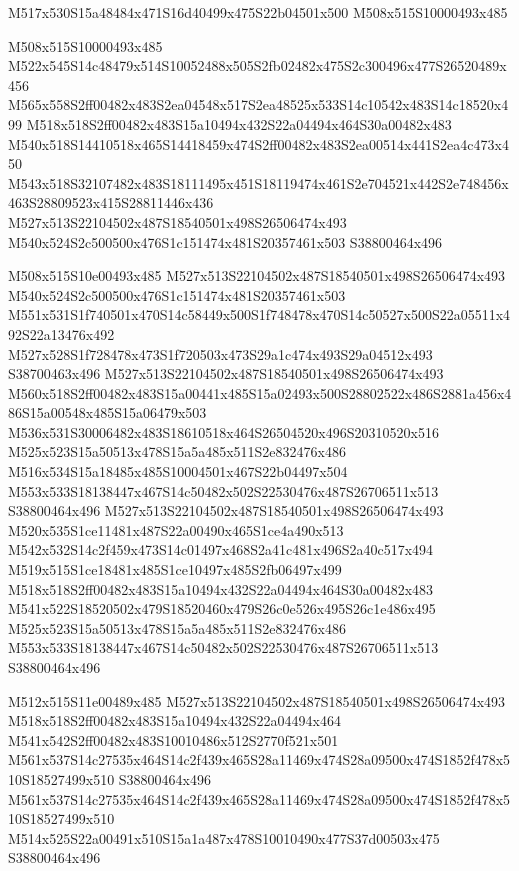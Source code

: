 \documentclass{article}
\begin{document}
\begin{multicols}{2}


\begin{center}
M517x530S15a48484x471S16d40499x475S22b04501x500 M508x515S10000493x485 
\end{center}


M508x515S10000493x485 M522x545S14c48479x514S10052488x505S2fb02482x475S2c300496x477S26520489x456 M565x558S2ff00482x483S2ea04548x517S2ea48525x533S14c10542x483S14c18520x499 M518x518S2ff00482x483S15a10494x432S22a04494x464S30a00482x483 M540x518S14410518x465S14418459x474S2ff00482x483S2ea00514x441S2ea4c473x450 M543x518S32107482x483S18111495x451S18119474x461S2e704521x442S2e748456x463S28809523x415S28811446x436 M527x513S22104502x487S18540501x498S26506474x493 M540x524S2c500500x476S1c151474x481S20357461x503 S38800464x496

M508x515S10e00493x485 M527x513S22104502x487S18540501x498S26506474x493 M540x524S2c500500x476S1c151474x481S20357461x503 M551x531S1f740501x470S14c58449x500S1f748478x470S14c50527x500S22a05511x492S22a13476x492 M527x528S1f728478x473S1f720503x473S29a1c474x493S29a04512x493 S38700463x496 M527x513S22104502x487S18540501x498S26506474x493 M560x518S2ff00482x483S15a00441x485S15a02493x500S28802522x486S2881a456x486S15a00548x485S15a06479x503 M536x531S30006482x483S18610518x464S26504520x496S20310520x516 M525x523S15a50513x478S15a5a485x511S2e832476x486 M516x534S15a18485x485S10004501x467S22b04497x504 M553x533S18138447x467S14c50482x502S22530476x487S26706511x513 S38800464x496 M527x513S22104502x487S18540501x498S26506474x493 M520x535S1ce11481x487S22a00490x465S1ce4a490x513 M542x532S14c2f459x473S14c01497x468S2a41c481x496S2a40c517x494 M519x515S1ce18481x485S1ce10497x485S2fb06497x499 M518x518S2ff00482x483S15a10494x432S22a04494x464S30a00482x483 M541x522S18520502x479S18520460x479S26c0e526x495S26c1e486x495 M525x523S15a50513x478S15a5a485x511S2e832476x486 M553x533S18138447x467S14c50482x502S22530476x487S26706511x513 S38800464x496

M512x515S11e00489x485 M527x513S22104502x487S18540501x498S26506474x493 M518x518S2ff00482x483S15a10494x432S22a04494x464 M541x542S2ff00482x483S10010486x512S2770f521x501 M561x537S14c27535x464S14c2f439x465S28a11469x474S28a09500x474S1852f478x510S18527499x510 S38800464x496 M561x537S14c27535x464S14c2f439x465S28a11469x474S28a09500x474S1852f478x510S18527499x510 M514x525S22a00491x510S15a1a487x478S10010490x477S37d00503x475 S38800464x496


\end{multicols}
\end{document}

